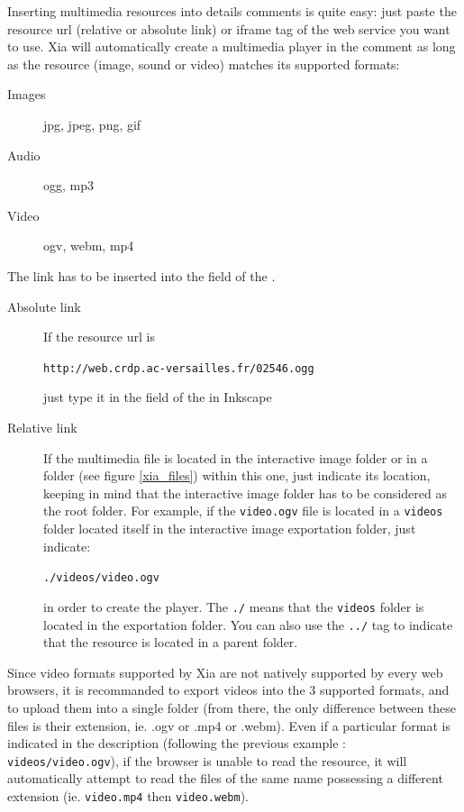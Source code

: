 Inserting multimedia resources into details comments is quite easy: just paste 
the resource url (relative or absolute link) or iframe tag of the web service 
you want to use. Xia will automatically create a multimedia player in the comment as long as 
the resource (image, sound or video) matches its supported formats: 
\begin{description}
 \item [Images] jpg, jpeg, png, gif
 \item [Audio] ogg, mp3
 \item [Video] ogv, webm, mp4
\end{description}

The link has to be inserted into the  field of the .

\begin{description}
 \item[Absolute link] If the resource url is
 
 \verb|http://web.crdp.ac-versailles.fr/02546.ogg|
 
 just type it in the  field of the  in 
 Inkscape
 
 \item [Relative link] If the multimedia file is located in the interactive image 
 folder or in a folder (see figure \ref{xia_files}) within this one, just indicate its location, keeping in 
 mind that the interactive image folder has to be considered as the root folder. 
 For example, if the \verb|video.ogv| file is located in a \verb|videos| 
 folder located itself in the interactive image exportation folder, just indicate:
 
  \verb|./videos/video.ogv|
 
  in order to create the player. The \verb|./| means that the \verb|videos| folder
  is located in the exportation folder. You can also use the \verb|../| tag to indicate
  that the resource is located in a parent folder.
\end{description}

\begin{tip}
Since video formats supported by Xia are not natively supported by every web 
browsers, it is recommanded to export videos into the 3 supported formats, 
and to upload them into a single folder (from there, the only difference 
between these files is their extension, ie. .ogv or .mp4 or .webm).
Even if a particular format is indicated in the description (following 
the previous example : \verb|videos/video.ogv|), if the browser is 
unable to read the resource, it will automatically attempt to read the files 
of the same name possessing a different extension (ie. \verb|video.mp4| 
then \verb|video.webm|).
\end{tip}


